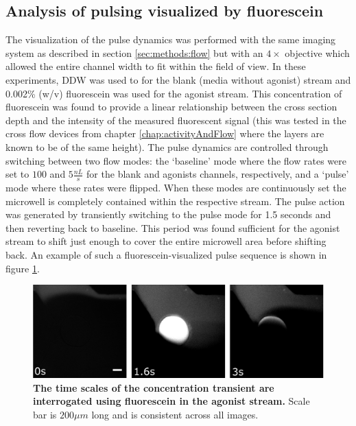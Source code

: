   \subsection{Analysis of pulsing visualized by fluorescein}
  \label{sec:pusling:fluo}
  The visualization of the pulse dynamics was performed with the same imaging system as described in section \ref{sec:methods:flow} but with an \(4\times\) objective which allowed the entire channel width to fit within the field of view. In these experiments, DDW was used to for the blank (media without agonist) stream and 0.002\% (w/v) fluorescein was used for the agonist stream. This concentration of fluorescein was found to provide a linear relationship between the cross section depth and the intensity of the measured fluorescent signal (this was tested in the cross flow devices from chapter \ref{chap:activityAndFlow} where the layers are known to be of the same height). The pulse dynamics are controlled through switching between two flow modes: the `baseline' mode where the flow rates were set to \(100\) and \(5 \frac{nL}{s}\) for the blank and agonists channels, respectively, and a `pulse' mode where these rates were flipped. When these modes are continuously set the microwell is completely contained within the respective stream. The pulse action was generated by transiently switching to the pulse mode for 1.5 seconds and then reverting back to baseline. This period was found sufficient for the agonist stream to shift just enough to cover the entire microwell area before shifting back. An example of such a fluorescein-visualized pulse sequence is shown in figure \ref{fig:pulses:pulseSequence}.

  \begin{figure}[h]
       \centering
       \includegraphics[width=15cm]{chapter6/figures/pulseSequence/pulseSequence.jpg}
       \caption[Fluorescence visualization of agonist pulsing]{\textbf{The time scales of the concentration transient are interrogated using fluorescein in the agonist stream.} Scale bar is \(200\mu m\) long and is consistent across all images.}
       \label{fig:pulses:pulseSequence}
  \end{figure}

